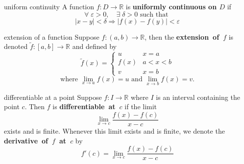 \documentclass[avery5371,grid]{flashcards}
\newcommand{\R}{\mathbb{R}}
\newcommand{\st}{\textrm{ such that }}
\begin{document}

\begin{flashcard}[Definition]{uniform continuity}
A function $f:D \rightarrow \R$ is \textbf{uniformly continuous on $D$} if
\begin{equation*}
\forall \; \varepsilon > 0, \quad \exists \; \delta > 0 \st
\end{equation*}
\begin{equation*}
|x-y|<\delta \Rightarrow |f(x)-f(y)|< \varepsilon
\end{equation*}
\end{flashcard}

\begin{flashcard}[Definition]{extension of a function}
Suppose $f:(a,b)\rightarrow \R$, then the \mbox{\textbf{extension of $f$}}
is denoted $\tilde{f}:[a,b]\rightarrow \R$ and defined by
\begin{equation*}
\tilde{f}(x) = \left\{ \begin{array}{ll}
  u & x=a \\
  f(x) & a<x<b \\
  v & x=b
\end{array} \right.
\end{equation*}
\begin{equation*}
\textrm{where } \lim_{x\rightarrow a} f(x)=u \textrm{ and }
\lim_{x\rightarrow b} f(x)=v.
\end{equation*}
\end{flashcard}


\begin{flashcard}[Definition]{differentiable at a point}
Suppose $f:I\rightarrow \R$ where $I$ is an interval containing the point
$c$.  Then $f$ is \mbox{\textbf{differentiable at $c$}} if the limit
\begin{equation*}
\lim_{x\rightarrow c} \dfrac{f(x)-f(c)}{x-c}
\end{equation*}
exists and is finite.  Whenever this limit exists and is finite, we
denote the \mbox{\textbf{derivative of $f$ at $c$}} by
\begin{equation*}
f'(c) = \lim_{x\rightarrow c} \dfrac{f(x)-f(c)}{x-c}
\end{equation*}
\end{flashcard}
\end{document}
